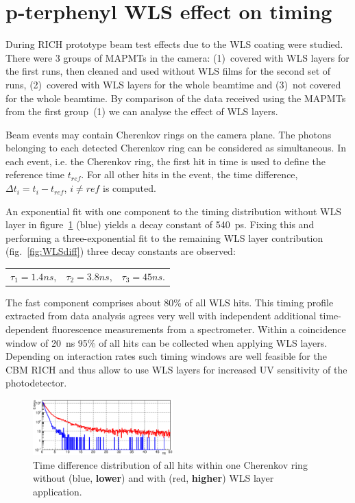\documentclass[final,5p,times,twocolumn]{elsarticle}
\begin{document}

\section{p-terphenyl WLS effect on timing}

During RICH prototype beam test effects due to the WLS coating were studied. There were 3 groups of MAPMTs in the camera: (1)~covered with WLS layers for the first runs, then cleaned and used without WLS films for the second set of runs, (2)~covered with WLS layers for the whole beamtime and (3)~not covered for the whole beamtime. By comparison of the data received using the MAPMTs from the first group~(1) we can analyse the effect of WLS layers.

Beam events may contain Cherenkov rings on the camera plane. The photons belonging to each detected Cherenkov ring can be considered as simultaneous. In each event, i.e. the Cherenkov ring, the first hit in time is used to define the reference time $ t_{ref} $. For all other hits in the event, the time difference, $ \Delta t_i = t_i - t_{ref} $, $ i \neq ref $ is computed.

An exponential fit with one component to the timing distribution without WLS layer in figure~\ref{fig:WLS} (blue) yields a decay constant of 540~ps. Fixing this and performing a three-exponential fit to the remaining WLS layer contribution (fig.~\ref{fig:WLSdiff}) three decay constants are observed:
\begin{center}
\begin{tabular}{ c c c }
$ \tau_1 = 1.4 ns $, & $ \tau_2 = 3.8 ns $, & $ \tau_3 = 45 ns $. \\
\end{tabular}
\end{center}
The fast component comprises about 80\% of all WLS hits. This timing profile extracted from data analysis agrees very well with independent additional time-dependent fluorescence measurements from a spectrometer.
Within a coincidence window of 20~ns 95\% of all hits can be collected when applying WLS layers. Depending on interaction rates such timing windows are well feasible for the CBM RICH and thus allow to use WLS layers for increased UV sensitivity of the photodetector.

\begin{figure}[h]
	\centering
	\includegraphics[width=0.48\textwidth]{figures/Two_curves_1Nov.eps}
	\caption{Time difference distribution of all hits within one Cherenkov ring without (blue, \textbf{lower}) and with (red, \textbf{higher}) WLS layer application.}
	\label{fig:WLS}
\end{figure}
\end{document}

